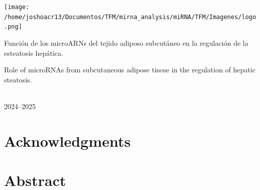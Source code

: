\documentclass[
  11pt,
  letterpaper,
]{book}
\author{}
\date{}
\begin{document}
\frontmatter


\mainmatter
\begin{titlepage}
\centering
\vspace*{-4mm}
\texttt{[image: /home/joshoacr13/Documentos/TFM/mirna\_analysis/miRNA/TFM/Imagenes/logo.png]}  %

\vspace{17mm}

\fontsize{28pt}{28pt}\selectfont
{}

\vspace{18.7mm}

\fontsize{20pt}{20pt}\selectfont
Función de los microARNs del tejido adiposo subcutáneo en la regulación de la esteatosis hepática.

\baselineskip 20pt
Role of microRNAs from subcutaneous adipose tissue in the regulation of hepatic steatosis.


\vspace*{2cm} 
\baselineskip 36pt
\fontsize{12pt}{12pt}\selectfont
{}

\vspace*{3.65mm} 
\fontsize{18pt}{18pt}\selectfont
{}

\vspace*{1cm}
\baselineskip 36pt
\fontsize{12pt}{12pt}\selectfont
{}

\vspace*{3.56mm}
\fontsize{14pt}{14pt}\selectfont
{}

\vspace*{16.45mm}
\fontsize{12pt}{12pt}\selectfont
{}

\vspace*{3.56mm}
\fontsize{12pt}{12pt}\selectfont
{}\\
2024–2025
\end{titlepage}

\frontmatter

\chapter{Acknowledgments}\label{acknowledgments}

\chapter{Abstract}\label{abstract}
\end{document}

